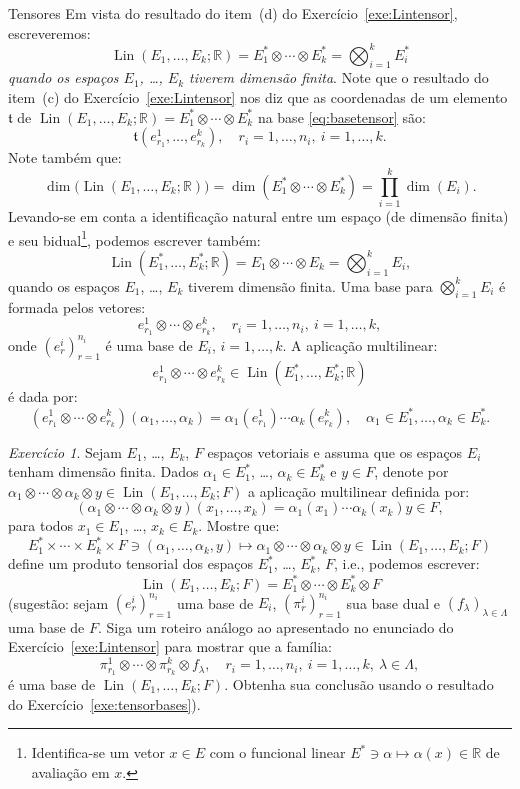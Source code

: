\documentclass[oneside,11pt]{amsart}
\newcommand{\R}{\mathds R}
\DeclareMathOperator{\Lin}{Lin}
\DeclareMathOperator{\Dim}{dim}
\theoremstyle{remark}\newtheorem{exercise}{Exercício}[section]
\theoremstyle{plain}\newtheorem{teo}{Teorema}[section]
\theoremstyle{plain}\newtheorem{lem}[teo]{Lema}
\theoremstyle{plain}\newtheorem{prop}[teo]{Proposição}
\theoremstyle{definition}\newtheorem{defin}[teo]{Definição}
\theoremstyle{remark}\newtheorem{rem}[teo]{Observação}
\theoremstyle{definition}\newtheorem{example}[teo]{Exemplo}
\numberwithin{equation}{section}
\begin{document}
\begin{section}{Tensores}
Em vista do resultado do item~(d) do Exercício~\ref{exe:Lintensor}, escreveremos:
\begin{equation}\label{eq:LinEitensor}
\Lin(E_1,\ldots,E_k;\R)=E_1^*\otimes\cdots\otimes E_k^*=\bigotimes_{i=1}^kE_i^*
\end{equation}
{\em quando os espaços $E_1$, \dots, $E_k$ tiverem dimensão finita}. Note que o resultado do item~(c) do Exercício~\ref{exe:Lintensor}
nos diz que as coordenadas de um elemento $\mathfrak t$ de $\Lin(E_1,\ldots,E_k;\R)=E_1^*\otimes\cdots\otimes E_k^*$ na base \eqref{eq:basetensor} são:
\[\mathfrak t(e^1_{r_1},\ldots,e^k_{r_k}),\quad r_i=1,\ldots,n_i,\ i=1,\ldots,k.\]
Note também que:
\[\Dim\!\big(\!\Lin(E_1,\ldots,E_k;\R)\big)=\Dim(E_1^*\otimes\cdots\otimes E_k^*)=\prod_{i=1}^k\Dim(E_i).\]
Levando-se em conta a identificação natural entre um espaço (de dimensão finita)
e seu bidual\footnote{%
Identifica-se um vetor $x\in E$ com o funcional linear $E^*\ni\alpha\mapsto\alpha(x)\in\R$ de avaliação em $x$.}, podemos escrever também:
\[\Lin(E_1^*,\ldots,E_k^*;\R)=E_1\otimes\cdots\otimes E_k=\bigotimes_{i=1}^kE_i,\]
quando os espaços $E_1$, \dots, $E_k$ tiverem dimensão finita. Uma base para $\bigotimes_{i=1}^kE_i$ é formada pelos vetores:
\[e^1_{r_1}\otimes\cdots\otimes e^k_{r_k},\quad r_i=1,\ldots,n_i,\ i=1,\ldots,k,\]
onde $(e^i_r)_{r=1}^{n_i}$ é uma base de $E_i$, $i=1,\ldots,k$. A aplicação multilinear:
\[e^1_{r_1}\otimes\cdots\otimes e^k_{r_k}\in\Lin(E_1^*,\ldots,E_k^*;\R)\]
é dada por:
\[(e^1_{r_1}\otimes\cdots\otimes e^k_{r_k})(\alpha_1,\ldots,\alpha_k)=\alpha_1(e^1_{r_1})\cdots\alpha_k(e^k_{r_k}),\quad\alpha_1\in E_1^*,\ldots,\alpha_k\in E_k^*.\]

\begin{exercise}
Sejam $E_1$, \dots, $E_k$, $F$ espaços vetoriais e assuma que os espaços $E_i$ tenham dimensão finita. Dados $\alpha_1\in E_1^*$, \dots, $\alpha_k\in E_k^*$
e $y\in F$, denote por $\alpha_1\otimes\cdots\otimes\alpha_k\otimes y\in\Lin(E_1,\ldots,E_k;F)$ a aplicação multilinear definida por:
\[(\alpha_1\otimes\cdots\otimes\alpha_k\otimes y)(x_1,\ldots,x_k)=\alpha_1(x_1)\cdots\alpha_k(x_k)y\in F,\]
para todos $x_1\in E_1$, \dots, $x_k\in E_k$. Mostre que:
\[E_1^*\times\cdots\times E_k^*\times F\ni(\alpha_1,\ldots,\alpha_k,y)\longmapsto\alpha_1\otimes\cdots\otimes\alpha_k\otimes y\in\Lin(E_1,\ldots,E_k;F)\]
define um produto tensorial dos espaços $E_1^*$, \dots, $E_k^*$, $F$, i.e., podemos escrever:
\[\Lin(E_1,\ldots,E_k;F)=E_1^*\otimes\cdots\otimes E_k^*\otimes F\]
(sugestão: sejam $(e^i_r)_{r=1}^{n_i}$ uma base de $E_i$, $(\pi^i_r)_{r=1}^{n_i}$ sua base dual e $(f_\lambda)_{\lambda\in\Lambda}$ uma base de $F$.
Siga um roteiro análogo ao apresentado no enunciado do Exercício~\ref{exe:Lintensor} para mostrar que a família:
\[\pi^1_{r_1}\otimes\cdots\otimes\pi^k_{r_k}\otimes f_\lambda,\quad r_i=1,\ldots,n_i,\ i=1,\ldots,k,\ \lambda\in\Lambda,\]
é uma base de $\Lin(E_1,\ldots,E_k;F)$. Obtenha sua conclusão usando o resultado do Exercício~\ref{exe:tensorbases}).
\end{exercise}


\end{section}
\end{document}
